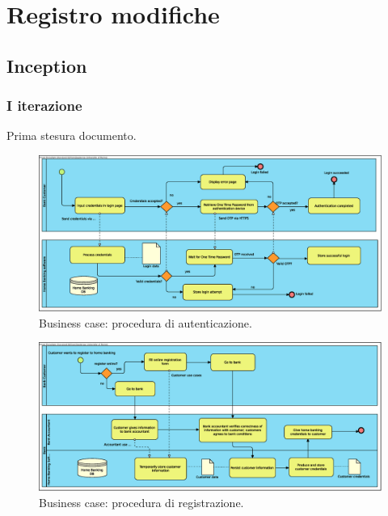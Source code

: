 \documentclass[10pt]{softeng} %
\begin{document}
\section{Registro modifiche}

\subsection{Inception}

\subsubsection{I iterazione}

Prima stesura documento.


\printcustombibsmall{}


\begin{figure}[hbt]
	\centering
	\includegraphics[width=\textheight, angle=90]{Images/Authentication.eps}
	\caption{Business case: procedura di autenticazione.}
	\label{fig:business_case_authentication}
\end{figure}

\begin{figure}[hbt]
	\centering
	\includegraphics[width=\textheight, angle=90]{Images/Home_Banking_registration.eps}
	\caption{Business case: procedura di registrazione.}
	\label{fig:business_case_registration}
\end{figure}
\end{document}
